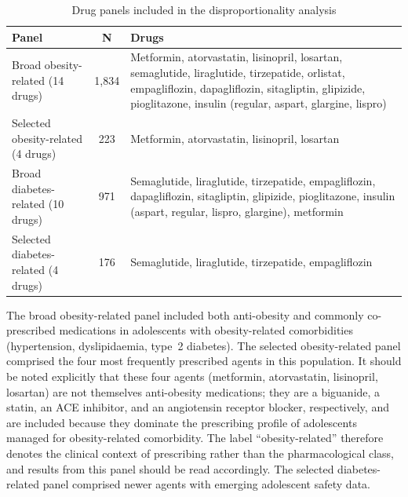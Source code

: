 \documentclass[10pt,a4paper]{article}
\begin{document}
\begin{table}[htbp]
\caption{Drug panels included in the disproportionality analysis}
\label{tab:panels}
\centering\scriptsize
\begin{tabular}{|p{3.4cm}|c|p{7cm}|}
\hline
\textbf{Panel} & \textbf{N} & \textbf{Drugs} \\
\hline
Broad obesity-related (14 drugs) & 1,834 & Metformin, atorvastatin, lisinopril, losartan, semaglutide, liraglutide, tirzepatide, orlistat, empagliflozin, dapagliflozin, sitagliptin, glipizide, pioglitazone, insulin (regular, aspart, glargine, lispro) \\
\hline
Selected obesity-related (4 drugs) & 223 & Metformin, atorvastatin, lisinopril, losartan \\
\hline
Broad diabetes-related (10 drugs) & 971 & Semaglutide, liraglutide, tirzepatide, empagliflozin, dapagliflozin, sitagliptin, glipizide, pioglitazone, insulin (aspart, regular, lispro, glargine), metformin \\
\hline
Selected diabetes-related (4 drugs) & 176 & Semaglutide, liraglutide, tirzepatide, empagliflozin \\
\hline
\end{tabular}
\end{table}

The broad obesity-related panel included both anti-obesity and commonly co-prescribed medications in adolescents with obesity-related comorbidities (hypertension, dyslipidaemia, type~2 diabetes). The selected obesity-related panel comprised the four most frequently prescribed agents in this population. It should be noted explicitly that these four agents (metformin, atorvastatin, lisinopril, losartan) are not themselves anti-obesity medications; they are a biguanide, a statin, an ACE inhibitor, and an angiotensin receptor blocker, respectively, and are included because they dominate the prescribing profile of adolescents managed for obesity-related comorbidity. The label ``obesity-related'' therefore denotes the clinical context of prescribing rather than the pharmacological class, and results from this panel should be read accordingly. The selected diabetes-related panel comprised newer agents with emerging adolescent safety data.
\end{document}
